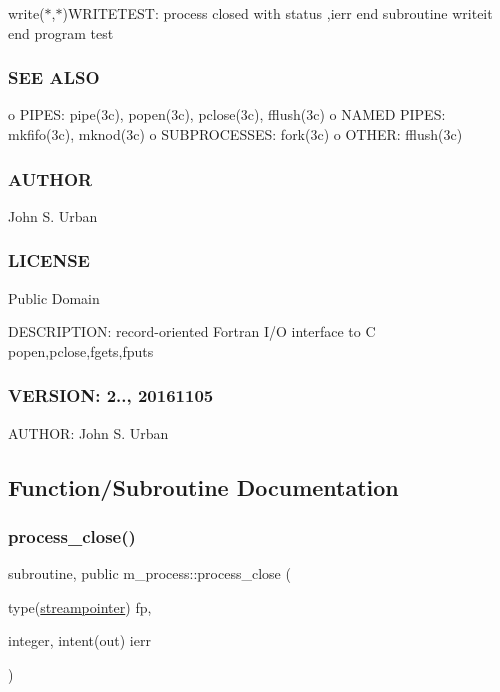 write($\ast$,$\ast$)\textquotesingle{}W\+R\+I\+T\+E\+T\+E\+ST\+: process closed with status \textquotesingle{},ierr end subroutine writeit end program test

\subsubsection*{S\+EE A\+L\+SO}

o P\+I\+P\+ES\+: pipe(3c), popen(3c), pclose(3c), fflush(3c) o N\+A\+M\+ED P\+I\+P\+ES\+: mkfifo(3c), mknod(3c) o S\+U\+B\+P\+R\+O\+C\+E\+S\+S\+ES\+: fork(3c) o O\+T\+H\+ER\+: fflush(3c) \subsubsection*{A\+U\+T\+H\+OR}

John S. Urban \subsubsection*{L\+I\+C\+E\+N\+SE}

Public Domain

D\+E\+S\+C\+R\+I\+P\+T\+I\+ON\+: record-\/oriented Fortran I/O interface to C popen,pclose,fgets,fputs \subsubsection*{V\+E\+R\+S\+I\+ON\+: 2.., 20161105}

A\+U\+T\+H\+OR\+: John S. Urban 

\subsection{Function/\+Subroutine Documentation}
\mbox{\label{namespacem__process_ab4c5cad3fb46686f0c9b71c3a634f6ae}} 
\subsubsection{\texorpdfstring{process\+\_\+close()}{process\_close()}}
{\footnotesize\ttfamily subroutine, public m\+\_\+process\+::process\+\_\+close (\begin{DoxyParamCaption}\item[{type(\mbox{\hyperlink{structm__process_1_1streampointer}{streampointer}})}]{fp,  }\item[{integer, intent(out)}]{ierr }\end{DoxyParamCaption})}



